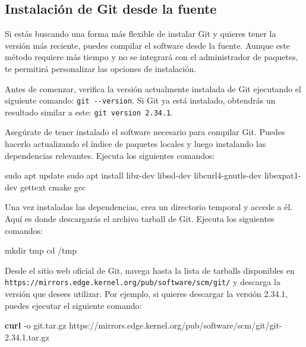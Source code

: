 \documentclass[
  letterpaper,
  DIV=11,
  numbers=noendperiod]{scrartcl}
\newenvironment{Shaded}{}{}
\newcommand{\AttributeTok}[1]{\textcolor[rgb]{0.84,0.23,0.29}{#1}}
\newcommand{\BuiltInTok}[1]{\textcolor[rgb]{0.84,0.23,0.29}{#1}}
\newcommand{\ExtensionTok}[1]{\textcolor[rgb]{0.84,0.23,0.29}{\textbf{#1}}}
\newcommand{\FunctionTok}[1]{\textcolor[rgb]{0.44,0.26,0.76}{#1}}
\newcommand{\NormalTok}[1]{\textcolor[rgb]{0.14,0.16,0.18}{#1}}
\begin{document}
\hypertarget{instalaciuxf3n-de-git-desde-la-fuente}{%
\subsection{Instalación de Git desde la
fuente}\label{instalaciuxf3n-de-git-desde-la-fuente}}

Si estás buscando una forma más flexible de instalar Git y quieres tener
la versión más reciente, puedes compilar el software desde la fuente.
Aunque este método requiere más tiempo y no se integrará con el
administrador de paquetes, te permitirá personalizar las opciones de
instalación.

Antes de comenzar, verifica la versión actualmente instalada de Git
ejecutando el siguiente comando: \texttt{git\ -\/-version}. Si Git ya
está instalado, obtendrás un resultado similar a este:
\texttt{git\ version\ 2.34.1}.

Asegúrate de tener instalado el software necesario para compilar Git.
Puedes hacerlo actualizando el índice de paquetes locales y luego
instalando las dependencias relevantes. Ejecuta los siguientes comandos:

\begin{Shaded}
\begin{Highlighting}[]
\FunctionTok{sudo}\NormalTok{ apt update}
\FunctionTok{sudo}\NormalTok{ apt install libz{-}dev libssl{-}dev libcurl4{-}gnutls{-}dev libexpat1{-}dev gettext cmake gcc}
\end{Highlighting}
\end{Shaded}

Una vez instaladas las dependencias, crea un directorio temporal y
accede a él. Aquí es donde descargarás el archivo tarball de Git.
Ejecuta los siguientes comandos:

\begin{Shaded}
\begin{Highlighting}[]
\FunctionTok{mkdir}\NormalTok{ tmp}
\BuiltInTok{cd}\NormalTok{ /tmp}
\end{Highlighting}
\end{Shaded}

Desde el sitio web oficial de Git, navega hasta la lista de tarballs
disponibles en
\texttt{https://mirrors.edge.kernel.org/pub/software/scm/git/} y
descarga la versión que desees utilizar. Por ejemplo, si quieres
descargar la versión 2.34.1, puedes ejecutar el siguiente comando:

\begin{Shaded}
\begin{Highlighting}[]
\ExtensionTok{curl} \AttributeTok{{-}o}\NormalTok{ git.tar.gz https://mirrors.edge.kernel.org/pub/software/scm/git/git{-}2.34.1.tar.gz}
\end{Highlighting}
\end{Shaded}
\end{document}
